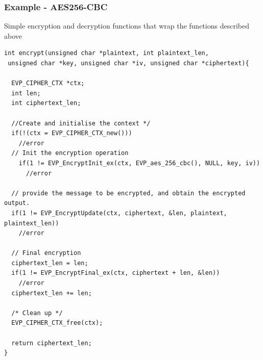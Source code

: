 \subsubsection*{Example - AES256-CBC}
Simple encryption and decryption functions that wrap the functions described above
\begin{verbatim}
int encrypt(unsigned char *plaintext, int plaintext_len,
 unsigned char *key, unsigned char *iv, unsigned char *ciphertext){

  EVP_CIPHER_CTX *ctx;
  int len;
  int ciphertext_len;

  //Create and initialise the context */
  if(!(ctx = EVP_CIPHER_CTX_new()))
    //error
  // Init the encryption operation
    if(1 != EVP_EncryptInit_ex(ctx, EVP_aes_256_cbc(), NULL, key, iv))
      //error

  // provide the message to be encrypted, and obtain the encrypted output.
  if(1 != EVP_EncryptUpdate(ctx, ciphertext, &len, plaintext, plaintext_len))
    //error
  
  // Final encryption
  ciphertext_len = len;
  if(1 != EVP_EncryptFinal_ex(ctx, ciphertext + len, &len))
    //error
  ciphertext_len += len;

  /* Clean up */
  EVP_CIPHER_CTX_free(ctx);

  return ciphertext_len;
}
\end{verbatim}
\begin{verbatim}

\end{verbatim}
